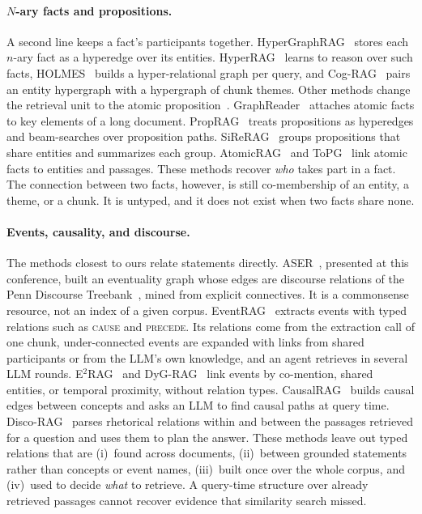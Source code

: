 \documentclass[sigconf, review, anonymous]{acmart}
\newcommand{\rel}[1]{\textsc{#1}}            %
\begin{document}
\paragraph{$N$-ary facts and propositions.}
A second line keeps a fact's participants together. HyperGraphRAG~\cite{luo2025hypergraphrag} stores each $n$-ary fact as a hyperedge over its entities. HyperRAG~\cite{lien2026hyperrag} learns to reason over such facts, HOLMES~\cite{panda2024holmes} builds a hyper-relational graph per query, and Cog-RAG~\cite{hu2026cograg} pairs an entity hypergraph with a hypergraph of chunk themes. Other methods change the retrieval unit to the atomic proposition~\cite{chen2024dense,min2023factscore}. GraphReader~\cite{li2024graphreader} attaches atomic facts to key elements of a long document. PropRAG~\cite{wang2025proprag} treats propositions as hyperedges and beam-searches over proposition paths. SiReRAG~\cite{zhang2025sirerag} groups propositions that share entities and summarizes each group. AtomicRAG~\cite{hou2026atomicrag} and ToPG~\cite{delmas2026topg} link atomic facts to entities and passages. These methods recover \emph{who} takes part in a fact. The connection between two facts, however, is still co-membership of an entity, a theme, or a chunk. It is untyped, and it does not exist when two facts share none.

\paragraph{Events, causality, and discourse.}
The methods closest to ours relate statements directly. ASER~\cite{zhang2020aser}, presented at this conference, built an eventuality graph whose edges are discourse relations of the Penn Discourse Treebank~\cite{prasad2017penn}, mined from explicit connectives. It is a commonsense resource, not an index of a given corpus. EventRAG~\cite{yang2025eventrag} extracts events with typed relations such as \rel{cause} and \rel{precede}. Its relations come from the extraction call of one chunk, under-connected events are expanded with links from shared participants or from the LLM's own knowledge, and an agent retrieves in several LLM rounds. E$^2$RAG~\cite{zhang2026e2rag} and DyG-RAG~\cite{sun2025dygrag} link events by co-mention, shared entities, or temporal proximity, without relation types. CausalRAG~\cite{wang2025causalrag} builds causal edges between concepts and asks an LLM to find causal paths at query time. Disco-RAG~\cite{liu2026discorag} parses rhetorical relations within and between the passages retrieved for a question and uses them to plan the answer. These methods leave out typed relations that are (i)~found across documents, (ii)~between grounded statements rather than concepts or event names, (iii)~built once over the whole corpus, and (iv)~used to decide \emph{what} to retrieve. A query-time structure over already retrieved passages cannot recover evidence that similarity search missed.
\end{document}

